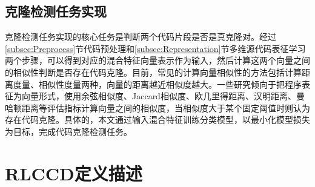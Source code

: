 \subsection{克隆检测任务实现}
\label{subsec:Clone detection}
克隆检测任务实现的核心任务是判断两个代码片段是否是真克隆对。经过\ref{subsec:Preprocess}节代码预处理和\ref{subsec:Representation}节多维源代码表征学习两个步骤，可以得到对应的混合特征向量表示作为输入，然后计算这两个向量之间的相似性判断是否存在代码克隆。目前，常见的计算向量相似性的方法包括计算距离度量、相似性度量两种，向量的距离越近相似度越大。一些研究倾向于把程序表征为向量形式，使用余弦相似度、Jaccard相似度、欧几里得距离、汉明距离、曼哈顿距离等评估指标计算向量之间的相似度，当相似度大于某个固定阈值时则认为存在代码克隆。具体的，本文通过输入混合特征训练分类模型，以最小化模型损失为目标，完成代码克隆检测任务。

\section{RLCCD定义描述}
\label{sec:RLCCD flow}

